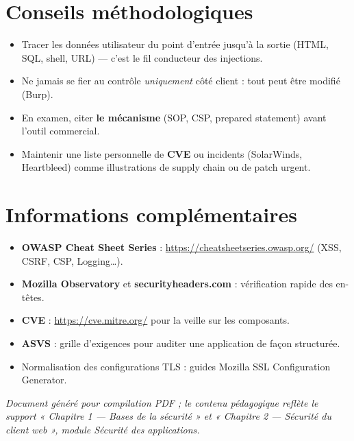 \documentclass[11pt,a4paper]{article}
\begin{document}
\section{Conseils méthodologiques}
\begin{itemize}[nosep]
  \item Tracer les données utilisateur du point d'entrée jusqu'à la sortie (HTML, SQL, shell, URL) — c'est le fil conducteur des injections.
  \item Ne jamais se fier au contrôle \emph{uniquement} côté client : tout peut être modifié (Burp).
  \item En examen, citer \textbf{le mécanisme} (SOP, CSP, prepared statement) avant l'outil commercial.
  \item Maintenir une liste personnelle de \textbf{CVE} ou incidents (SolarWinds, Heartbleed) comme illustrations de supply chain ou de patch urgent.
\end{itemize}

\section{Informations complémentaires}
\begin{itemize}[nosep]
  \item \textbf{OWASP Cheat Sheet Series} : \url{https://cheatsheetseries.owasp.org/} (XSS, CSRF, CSP, Logging\ldots).
  \item \textbf{Mozilla Observatory} et \textbf{securityheaders.com} : vérification rapide des en-têtes.
  \item \textbf{CVE} : \url{https://cve.mitre.org/} pour la veille sur les composants.
  \item \textbf{ASVS} : grille d'exigences pour auditer une application de façon structurée.
  \item Normalisation des configurations TLS : guides Mozilla SSL Configuration Generator.
\end{itemize}

\vfill
\noindent\textit{Document généré pour compilation PDF ; le contenu pédagogique reflète le support « Chapitre 1 — Bases de la sécurité » et « Chapitre 2 — Sécurité du client web », module Sécurité des applications.}
\end{document}
